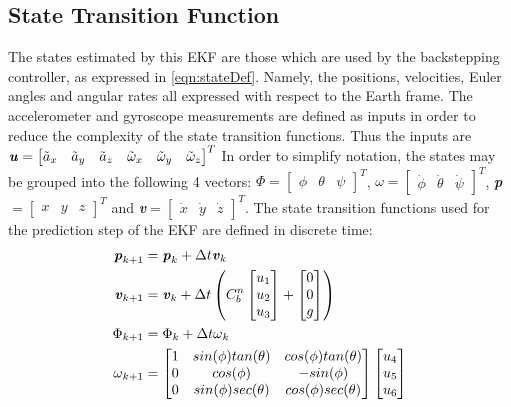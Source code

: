 \subsection{State Transition Function}
The states estimated by this EKF are those which are used by the backstepping controller, as expressed in \eqref{eqn:stateDef}. Namely, the positions, velocities, Euler angles and angular rates all expressed with respect to the Earth frame. The accelerometer and gyroscope measurements are defined as inputs in order to reduce the complexity of the state transition functions\cite{Driessen2018}. Thus the inputs are $\textbf{\textit{u}}=
\begin{bmatrix}
\tilde{a}_{x}&\tilde{a}_{y}&\tilde{a}_{z}&\tilde{\omega}_{x}&\tilde{\omega}_{y}&\tilde{\omega}_{z}
\end{bmatrix}^{T}
$
In order to simplify notation, the states may be grouped into the following 4 vectors: \textbf{\textit{$\Phi$}}$=\begin{bmatrix}\phi& \theta& \psi\end{bmatrix}^{T}$, \textbf{\textit{$\omega$}}$=\begin{bmatrix}\dot{\phi}& \dot{\theta}& \dot{\psi}\end{bmatrix}^{T}$, \textbf{\textit{p}}$=\begin{bmatrix}x& y& z\end{bmatrix}^{T}$ and \textbf{\textit{v}}$=\begin{bmatrix}\dot{x}& \dot{y}& \dot{z}\end{bmatrix}^{T}$. The state transition functions used for the prediction step of the EKF are defined in discrete time:
\begin{equation}\label{eqn:OFS_EKFStateTrans}
\begin{split}
\textbf{\textit{p}}_{k+1}&=\textbf{\textit{p}}_{k}+\Delta t\textbf{\textit{v}}_{k} \\
\textbf{\textit{v}}_{k+1}&=\textbf{\textit{v}}_{k}+\Delta t\left( C^{n}_{b}
\begin{bmatrix}
u_{1}\\
u_{2}\\
u_{3}
\end{bmatrix}
+
\begin{bmatrix}
0\\
0\\
g
\end{bmatrix}
\right)\\
\textbf{\textit{$\Phi$}}_{k+1}&=\textbf{\textit{$\Phi$}}_{k}+\Delta t\textbf{\textit{$\omega$}}_{k}\\
\textbf{\textit{$\omega$}}_{k+1}&=
\begin{bmatrix}
1& sin(\phi)tan(\theta)& cos(\phi)tan(\theta)\\
0 &cos(\phi) &-sin(\phi)\\
0 &sin(\phi)sec(\theta) &cos(\phi)sec(\theta)
\end{bmatrix}
\begin{bmatrix}
u_{4}\\
u_{5}\\
u_{6}
\end{bmatrix}
\end{split}
\end{equation}


